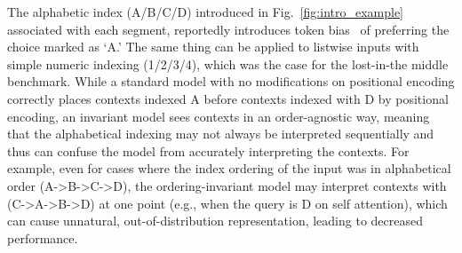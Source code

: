 The alphabetic index (A/B/C/D) introduced in Fig.~\ref{fig:intro_example} associated with each segment, reportedly introduces token bias~\cite{wei2024unveilingselectionbiasesexploring} of preferring the choice marked as `A.' The same thing can be applied to listwise inputs with simple numeric indexing (1/2/3/4), which was the case for the lost-in-the middle benchmark. While a standard model with no modifications on positional encoding correctly places contexts indexed A before contexts indexed with D by positional encoding, an invariant model sees contexts in an order-agnostic way, meaning that the alphabetical indexing may not always be interpreted sequentially and thus can confuse the model from accurately interpreting the contexts.
For example, even for cases where the index ordering of the input was in alphabetical order (A->B->C->D), the ordering-invariant model may interpret contexts with (C->A->B->D) at one point (e.g., when the query is D on self attention), which can cause unnatural, out-of-distribution representation, leading to decreased performance.
